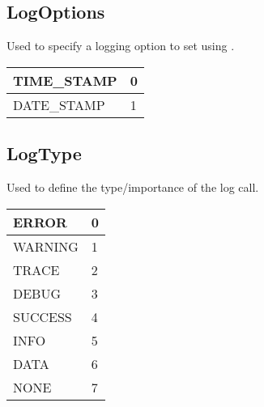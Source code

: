 \documentclass[letterpaper,10pt,english]{sphinxmanual}
\begin{document}
\subsection{LogOptions}
\label{\detokenize{log:logoptions}}

\begin{fulllineitems}
\label{\detokenize{log:_CPPv2N6pessum10LogOptionsE}}%
\pysigstartmultiline
{}%
\pysigstopmultiline
Used to specify a logging option to set using {\hyperref[\detokenize{log:_CPPv2N6pessum12SetLogOptionEii}]{}}.


\begin{savenotes}\sphinxattablestart
\centering
\begin{tabulary}{\linewidth}[t]{|T|T|}
\hline

TIME\_STAMP
&
0
\\
\hline
DATE\_STAMP
&
1
\\
\hline
\end{tabulary}
\par
\sphinxattableend\end{savenotes}

\end{fulllineitems}



\subsection{LogType}
\label{\detokenize{log:logtype}}

\begin{fulllineitems}
\label{\detokenize{log:_CPPv2N6pessum7LogTypeE}}%
\pysigstartmultiline
{}%
\pysigstopmultiline
Used to define the type/importance of the log call.


\begin{savenotes}\sphinxattablestart
\centering
\begin{tabulary}{\linewidth}[t]{|T|T|}
\hline

ERROR
&
0
\\
\hline
WARNING
&
1
\\
\hline
TRACE
&
2
\\
\hline
DEBUG
&
3
\\
\hline
SUCCESS
&
4
\\
\hline
INFO
&
5
\\
\hline
DATA
&
6
\\
\hline
NONE
&
7
\\
\hline
\end{tabulary}
\par
\sphinxattableend\end{savenotes}

\end{fulllineitems}
\end{document}

